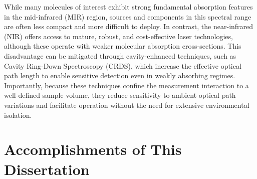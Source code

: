 \documentclass[8pt,a4paper]{report}
\begin{document}
	While many molecules of interest exhibit strong fundamental absorption features in the mid-infrared (MIR) region, sources and components in this spectral range are often less compact and more difficult to deploy. In contrast, the near-infrared (NIR) offers access to mature, robust, and cost-effective laser technologies, although these operate with weaker molecular absorption cross-sections. This disadvantage can be mitigated through cavity-enhanced techniques, such as Cavity Ring-Down Spectroscopy (CRDS), which increase the effective optical path length to enable sensitive detection even in weakly absorbing regimes. Importantly, because these techniques confine the measurement interaction to a well-defined sample volume, they reduce sensitivity to ambient optical path variations and facilitate operation without the need for extensive environmental isolation.
	
	\section{Accomplishments of This Dissertation}
	
\end{document}
